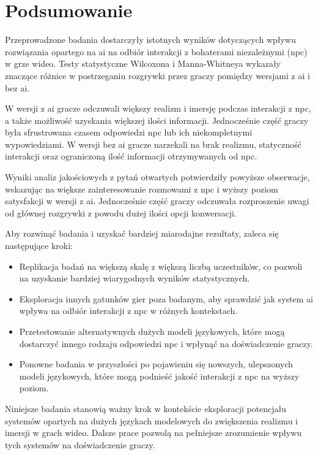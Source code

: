 
\chapter*{Podsumowanie}

Przeprowadzone badania dostarczyły istotnych wyników dotyczących wpływu rozwiązania opartego na \gls{ai} na odbiór
interakcji z bohaterami niezależnymi (\gls{npc}) w grze wideo. Testy statystyczne Wilcoxona i Manna-Whitneya wykazały
znaczące różnice w postrzeganiu rozgrywki przez graczy pomiędzy wersjami z \gls{ai} i bez \gls{ai}.

W wersji z \gls{ai} gracze odczuwali większy realizm i imersję podczas interakcji z \gls{npc}, a także możliwość uzyskania
większej ilości informacji. Jednocześnie część graczy była sfrustrowana czasem odpowiedzi \gls{npc} lub ich niekompletnymi
wypowiedziami. W wersji bez \gls{ai} gracze narzekali na brak realizmu, statyczność interakcji oraz ograniczoną ilość
informacji otrzymywanych od \gls{npc}.

Wyniki analiz jakościowych z pytań otwartych potwierdziły powyższe obserwacje, wskazując na większe zainteresowanie
rozmowami z \gls{npc} i wyższy poziom satysfakcji w wersji z \gls{ai}. Jednocześnie część graczy odczuwała rozproszenie uwagi
od głównej rozgrywki z powodu dużej ilości opcji konwersacji.

Aby rozwinąć badania i uzyskać bardziej miarodajne rezultaty, zaleca się następujące kroki:

\begin{itemize}
    \item Replikacja badań na większą skalę z większą liczbą uczestników, co pozwoli na uzyskanie bardziej
          wiarygodnych wyników statystycznych.
    \item Eksploracja innych gatunków gier poza badanym, aby sprawdzić jak system \gls{ai} wpływa na odbiór interakcji
          z \gls{npc} w różnych kontekstach.
    \item Przetestowanie alternatywnych dużych modeli językowych, które mogą dostarczyć innego rodzaju odpowiedzi
          \gls{npc} i wpłynąć na doświadczenie graczy.
    \item Ponowne badania w przyszłości po pojawieniu się nowszych, ulepszonych modeli językowych, które mogą
          podnieść jakość interakcji z \gls{npc} na wyższy poziom.
\end{itemize}

Niniejsze badania stanowią ważny krok w kontekście eksploracji potencjału systemów opartych na dużych językach modelowych do
zwiększenia realizmu i imersji w grach wideo. Dalsze prace pozwolą na pełniejsze zrozumienie wpływu tych 
systemów na doświadczenie graczy.